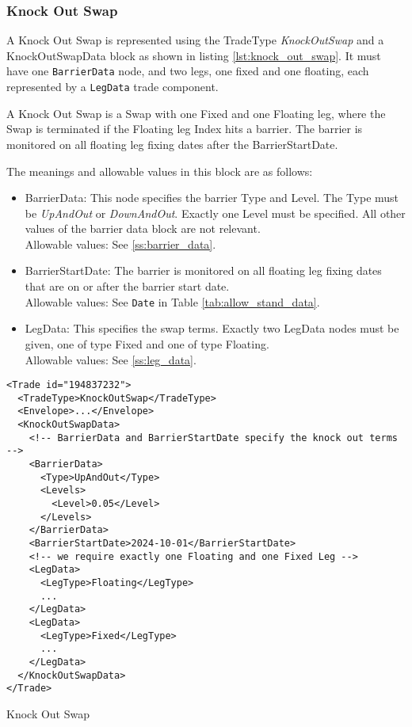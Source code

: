 \subsubsection{Knock Out Swap}

A Knock Out Swap is represented using the TradeType \emph{KnockOutSwap} and a KnockOutSwapData block as shown in listing
\ref{lst:knock_out_swap}. It must have one \lstinline!BarrierData! node, and two legs, one fixed and one floating, each represented by a \lstinline!LegData! trade component. 

A Knock Out Swap is a Swap with one Fixed and one Floating leg, where the Swap is terminated if the Floating leg Index hits a barrier. The barrier is monitored on all floating leg fixing dates after the BarrierStartDate.

The meanings and allowable values in this block are as follows:

\begin{itemize}
\item BarrierData: This node specifies the barrier Type and Level. The Type must be \emph{UpAndOut} or
  \emph{DownAndOut}. Exactly one Level must be specified. All other values of the barrier data block are not relevant. \\
  Allowable values: See \ref{ss:barrier_data}.

\item BarrierStartDate: The barrier is monitored on all floating leg fixing dates that are on or after the barrier start date. \\
  Allowable values: See \lstinline!Date! in Table \ref{tab:allow_stand_data}.

\item LegData: This specifies the swap terms. Exactly two LegData nodes must be given, one of type Fixed and one of type Floating. \\
    Allowable values: See \ref{ss:leg_data}.
\end{itemize}

\begin{listing}[hbt]
\begin{verbatim}
<Trade id="194837232">
  <TradeType>KnockOutSwap</TradeType>
  <Envelope>...</Envelope>
  <KnockOutSwapData>
    <!-- BarrierData and BarrierStartDate specify the knock out terms -->
    <BarrierData>
      <Type>UpAndOut</Type>
      <Levels>
        <Level>0.05</Level>
      </Levels>
    </BarrierData>
    <BarrierStartDate>2024-10-01</BarrierStartDate>
    <!-- we require exactly one Floating and one Fixed Leg -->
    <LegData>
      <LegType>Floating</LegType>
      ...
    </LegData>
    <LegData>
      <LegType>Fixed</LegType>
      ...
    </LegData>
  </KnockOutSwapData>
</Trade>
\end{verbatim}
\caption{Knock Out Swap}
\label{lst:knock_out_swap}
\end{listing}